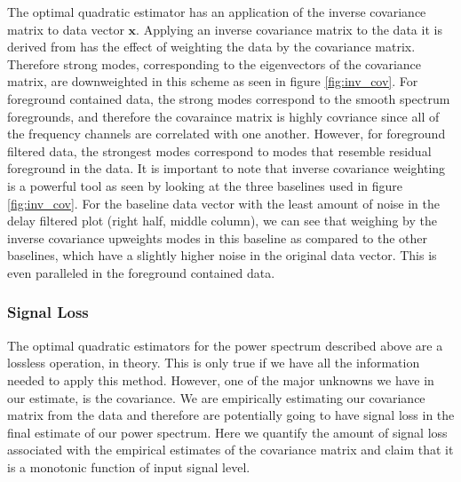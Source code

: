 \documentclass[twocolumn,numberedappendix]{emulateapj} \shorttitle{PSA64}
\newcommand{\x}{\mathbf{x}} \newcommand{\xhat}{\hat{\mathbf{x}}}
\begin{document}
The optimal quadratic estimator has an application of the inverse covariance
matrix to data vector $\x$. Applying an inverse covariance matrix to the data it
is derived from has the effect of weighting the data by the covariance matrix.
Therefore strong modes, corresponding to the eigenvectors of the covariance
matrix, are downweighted in this scheme as seen in figure \ref{fig:inv_cov}.
For foreground contained data, the strong modes correspond to the smooth
spectrum foregrounds, and therefore the covaraince matrix is highly covriance
since all of the frequency channels are correlated with one another. However,
for foreground filtered data, the strongest modes correspond to modes that
resemble residual foreground in the data. It is important to note that inverse
covariance weighting is a powerful tool as seen by looking at the three
baselines used in figure \ref{fig:inv_cov}. For the baseline data vector with
the least amount of noise in the delay filtered plot (right half, middle
column), we can see that weighing by the inverse covariance upweights modes in
this baseline as compared to the other baselines, which have a slightly higher
noise in the original data vector. This is even paralleled in the foreground
contained data.


\subsubsection{Signal Loss}
The optimal quadratic estimators for the power spectrum described above are a
lossless operation, in theory. This is only true if we have all the information
needed to apply this method. However, one of the major unknowns we have in our
estimate, is the covariance. We are empirically estimating our covariance matrix
from the data and therefore are potentially going to have signal loss in the
final estimate of our power spectrum. Here we quantify the amount of signal loss
associated with the empirical estimates of the covariance matrix and claim that
it is a monotonic function of input signal level.
\end{document}
